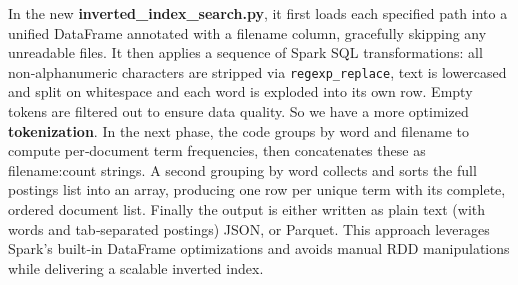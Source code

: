 In the new \textbf{inverted\_index\_search.py}, it first loads each specified path into a unified DataFrame annotated with a filename column, gracefully skipping any unreadable files. It then applies a sequence of Spark SQL transformations: all non‐alphanumeric characters are stripped via \texttt{regexp\_replace}, text is lowercased and split on whitespace and each word is exploded into its own row. Empty tokens are filtered out to ensure data quality. So we have a more optimized \textbf{tokenization}. In the next phase, the code groups by word and filename to compute per‐document term frequencies, then concatenates these as filename:count strings. A second grouping by word collects and sorts the full postings list into an array, producing one row per unique term with its complete, ordered document list. Finally the output is either written as plain text (with words and tab‐separated postings) JSON, or Parquet. This approach leverages Spark’s built‐in DataFrame optimizations and avoids manual RDD manipulations while delivering a scalable inverted index. 



